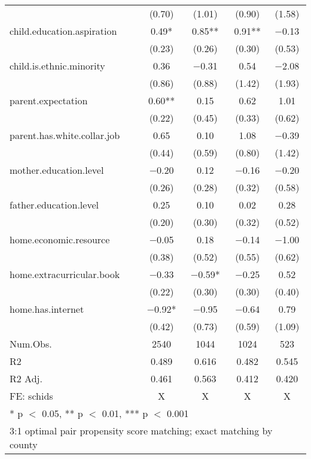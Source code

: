 \documentclass[
  man,floatsintext]{apa7}
\begin{document}
\begin{table}
\begin{tabular}[t]{lcccc}
 & (\num{0.70}) & (\num{1.01}) & (\num{0.90}) & (\num{1.58})\\
child.education.aspiration & \num{0.49}* & \num{0.85}** & \num{0.91}** & \num{-0.13}\\
 & (\num{0.23}) & (\num{0.26}) & (\num{0.30}) & (\num{0.53})\\
child.is.ethnic.minority & \num{0.36} & \num{-0.31} & \num{0.54} & \num{-2.08}\\
 & (\num{0.86}) & (\num{0.88}) & (\num{1.42}) & (\num{1.93})\\
parent.expectation & \num{0.60}** & \num{0.15} & \num{0.62} & \num{1.01}\\
 & (\num{0.22}) & (\num{0.45}) & (\num{0.33}) & (\num{0.62})\\
parent.has.white.collar.job & \num{0.65} & \num{0.10} & \num{1.08} & \num{-0.39}\\
 & (\num{0.44}) & (\num{0.59}) & (\num{0.80}) & (\num{1.42})\\
mother.education.level & \num{-0.20} & \num{0.12} & \num{-0.16} & \num{-0.20}\\
 & (\num{0.26}) & (\num{0.28}) & (\num{0.32}) & (\num{0.58})\\
father.education.level & \num{0.25} & \num{0.10} & \num{0.02} & \num{0.28}\\
 & (\num{0.20}) & (\num{0.30}) & (\num{0.32}) & (\num{0.52})\\
home.economic.resource & \num{-0.05} & \num{0.18} & \num{-0.14} & \num{-1.00}\\
 & (\num{0.38}) & (\num{0.52}) & (\num{0.55}) & (\num{0.62})\\
home.extracurricular.book & \num{-0.33} & \num{-0.59}* & \num{-0.25} & \num{0.52}\\
 & (\num{0.22}) & (\num{0.30}) & (\num{0.30}) & (\num{0.40})\\
home.has.internet & \num{-0.92}* & \num{-0.95} & \num{-0.64} & \num{0.79}\\
 & (\num{0.42}) & (\num{0.73}) & (\num{0.59}) & (\num{1.09})\\
\midrule
Num.Obs. & \num{2540} & \num{1044} & \num{1024} & \num{523}\\
R2 & \num{0.489} & \num{0.616} & \num{0.482} & \num{0.545}\\
R2 Adj. & \num{0.461} & \num{0.563} & \num{0.412} & \num{0.420}\\
FE: schids & X & X & X & X\\
\bottomrule
\multicolumn{5}{l}{\rule{0pt}{1em}* p $<$ 0.05, ** p $<$ 0.01, *** p $<$ 0.001}\\
\multicolumn{5}{l}{\rule{0pt}{1em}3:1 optimal pair propensity score matching; exact matching by county}\\
\end{tabular}
\end{table}
\end{document}
